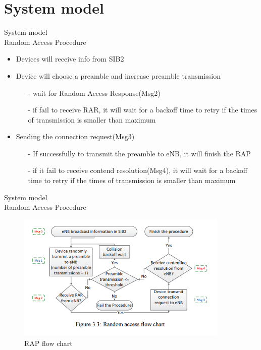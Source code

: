 \documentclass{beamer}
\begin{document}
\section{System model}
\begin{frame}{{System model}\\Random Access Procedure}
    \begin{itemize}
        \item{Devices will receive info from SIB2}
        \item{Device will choose a preamble and increase preamble transmission}
        \begin{itemize}
            \item[-] wait for Random Access Response(Msg2)
            \item[-] if fail to receive RAR, it will wait for a backoff time to retry if the times of transmission is smaller than maximum
        \end{itemize}
        \item{Sending the connection request(Msg3)}
        \begin{itemize}
            \item[-]{If successfully to transmit the preamble to eNB, it will finish the RAP}
            \item[-] if it fail to receive contend resolution(Msg4), it will wait for a backoff time to retry if the times of transmission is smaller than maximum
        \end{itemize}
    \end{itemize}
\end{frame}
\begin{frame}{{System model}\\Random Access Procedure}
    \begin{figure}[t]
        \centering
        \includegraphics[width=0.9\textwidth]{figures/3_3.png}
        \caption{RAP flow chart}
    \end{figure}
\end{frame}
\end{document}
